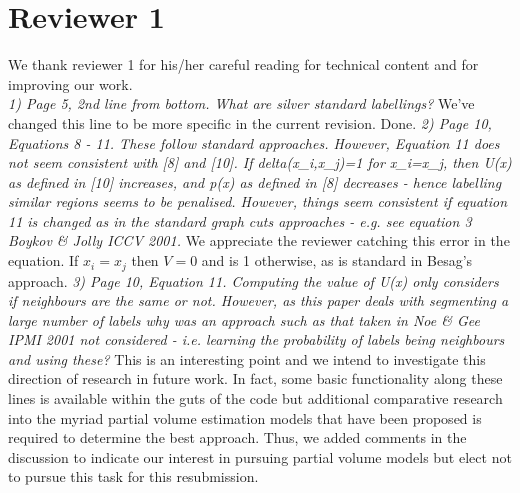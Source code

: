 \documentclass[11pt]{article}
\begin{document}
\section{Reviewer 1}
We thank reviewer 1 for his/her careful reading for technical content
and for improving our work.\\
\newline
\newline
{\em 1) Page 5, 2nd line from bottom. What are silver standard
  labellings?}
\newline
\newline
We've changed this line to be more specific in the current revision.
\newline
\newline
Done.  
\newline
\newline
{\em 2) Page 10, Equations 8 - 11. These follow standard
  approaches. However, Equation 11 does not seem consistent with [8]
  and [10]. If delta(x\_i,x\_j)=1 for x\_i=x\_j, then U(x) as defined in
  [10] increases, and p(x) as defined in [8] decreases - hence
  labelling similar regions seems to be penalised. However, things
  seem consistent if equation 11 is changed as in the standard graph
  cuts approaches - e.g. see equation 3 Boykov \& Jolly ICCV 2001.}
\newline
\newline
We appreciate the reviewer catching this error in the equation.  If $x_i = x_j$ then $V=0$ and is
1 otherwise, as is standard in Besag's approach. 
\newline
\newline
{\em 3) Page 10, Equation 11. Computing the value of U(x) only
  considers if neighbours are the same or not. However, as this paper
  deals with segmenting a large number of labels why was an approach
  such as that taken in Noe \& Gee IPMI 2001 not considered -
  i.e. learning the probability of labels being neighbours and using
  these?}
\newline
\newline
This is an interesting point and we intend to investigate this
direction of research in future work.  In fact, some basic
functionality along these lines is available within the guts of the
code but additional comparative research into the myriad partial volume
estimation models that have been proposed is required to determine the
best approach.  Thus, we added comments in the discussion to indicate
our interest in pursuing partial volume models but elect not to pursue
this task for this resubmission. 
\end{document}
